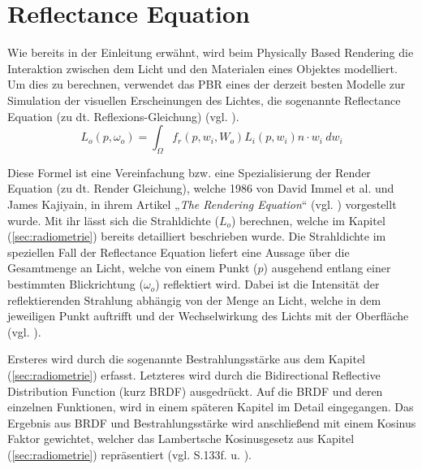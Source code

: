 \documentclass[
  11pt,
  a4paper,
  oneside
  ]{article}
\begin{document}
\section{Reflectance Equation}\label{sec:reflac}
Wie bereits in der Einleitung erwähnt, wird beim Physically Based Rendering die Interaktion zwischen dem Licht und den Materialen eines Objektes modelliert. Um dies zu berechnen, verwendet das PBR eines der derzeit besten Modelle zur Simulation der visuellen Erscheinungen des Lichtes, die sogenannte Reflectance Equation (zu dt. Reflexions-Gleichung) 
(vgl. \cite{learnOpenGL}). 
\begin{equation}
  L_{o}\left( p,\omega _{o}\right) =\int _{\Omega }f_{r}\left( p,w_{i},W_{o}\right)L_{i}\left( p,w_{i}\right)n\cdot w_{i} \ dw_{i}
\end{equation}

Diese Formel ist eine Vereinfachung bzw. eine Spezialisierung der Render Equation (zu dt. Render Gleichung), welche 1986 von David Immel et al. und James Kajiyain, in ihrem Artikel „\textit{The Rendering Equation}“ (vgl. \cite{theRenderingEquation}) vorgestellt wurde. Mit ihr lässt sich die Strahldichte ($L_{o}$) berechnen, welche im Kapitel (\ref{sec:radiometrie}) bereits detailliert beschrieben wurde. Die Strahldichte im speziellen Fall der Reflectance Equation liefert eine Aussage über die Gesamtmenge an Licht, welche von einem Punkt ($p$) ausgehend entlang einer bestimmten Blickrichtung ($\omega_{o}$) reflektiert wird. Dabei ist die Intensität der reflektierenden Strahlung abhängig von der Menge an Licht, welche in dem jeweiligen Punkt auftrifft und der Wechselwirkung des Lichts mit der Oberfläche (vgl. \cite{learnOpenGL}). 

Ersteres wird durch die sogenannte Bestrahlungsstärke aus dem Kapitel (\ref{sec:radiometrie}) erfasst. Letzteres wird durch die Bidirectional Reflective Distribution Function (kurz BRDF) ausgedrückt. Auf die BRDF und deren einzelnen Funktionen, wird in einem späteren Kapitel im Detail eingegangen. Das Ergebnis aus BRDF und Bestrahlungsstärke wird anschließend mit einem Kosinus Faktor gewichtet, welcher das Lambertsche Kosinusgesetz aus Kapitel (\ref{sec:radiometrie}) repräsentiert 
(vgl. S.133f. \cite{openGlWolf} u. \cite{learnOpenGL}).
\end{document}
